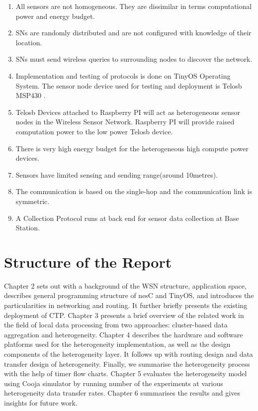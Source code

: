 \begin{enumerate}
	\item All sensors are not homogeneous. They are dissimilar in terms computational power and energy budget.
	
	\item \acp{SN} are randomly distributed and are not configured with knowledge of their location.
	
	\item \acp{SN} must send wireless queries to surrounding nodes to discover the network.
	
	\item Implementation and testing of protocols is done on TinyOS \cite{TinyOS} Operating System. The sensor node device used for testing and deployment is Telosb MSP430 \cite{crossbow:TELOSB}.
	
	\item Telosb Devices attached to Raspberry PI will act as heterogeneous sensor nodes in the Wireless Sensor Network. Raspberry PI will provide raised computation power to the low power Telosb device.
	
	\item There is very high energy budget for the heterogeneous high compute power devices.
	
	\item Sensors have limited sensing and sending range(around 10metres).
	
	\item The communication is based on the single-hop and the communication link is symmetric.
	
	\item A Collection Protocol runs at back end for sensor data collection at Base Station.
	
\end{enumerate}


\section{Structure of the Report}

Chapter 2 sets out with a background of the \ac{WSN} structure, application space, describes general programming structure of nesC and TinyOS, and introduces the particularities in networking and routing. It further briefly presents the existing deployment of \ac{CTP}. Chapter 3 presents a brief overview of the related work in the field of local data processing from two approaches: cluster-based data aggregation and heterogeneity. Chapter 4 describes the hardware and software platforms used for the heterogeneity implementation, as well as the design components of the heterogeneity layer. It follows up with routing design and data transfer design of heterogeneity. Finally, we summarise the heterogeneity process with the help of timer flow charts. Chapter 5 evaluates the heterogeneity model using Cooja simulator by running number of the experiments at various heterogeneity data transfer rates. Chapter 6 summarises the results and gives insights for future work.